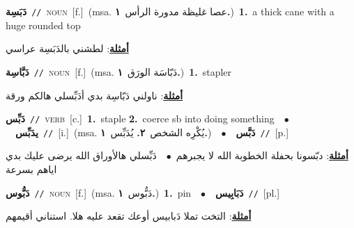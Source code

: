\documentclass[10pt,a4paper,twoside]{article} %
\begin{document}
\begin{multicols}{2}
{{{{\setlength\topsep{0pt}\textbf{\foreignlanguage{arabic}{دَبَسِة}}\ {\color{gray}\texttt{//}\color{black}}\ \textsc{noun}\ [f.]\ \color{gray}(msa. \foreignlanguage{arabic}{عصا غليظة مدورة الرأس}~\foreignlanguage{arabic}{\textbf{١.}})\color{black}\ \textbf{1.}~a thick cane with a huge rounded top\  \begin{flushright}\color{gray}\foreignlanguage{arabic}{\textbf{\underline{\foreignlanguage{arabic}{أمثلة}}}: لطشني بالدَبَسِة عراسي}\end{flushright}\color{black}} \vspace{2mm}

{\setlength\topsep{0pt}\textbf{\foreignlanguage{arabic}{دَبَّاسِة}}\ {\color{gray}\texttt{//}\color{black}}\ \textsc{noun}\ [f.]\ \color{gray}(msa. \foreignlanguage{arabic}{دَبّاسَة الورَق}~\foreignlanguage{arabic}{\textbf{١.}})\color{black}\ \textbf{1.}~stapler\  \begin{flushright}\color{gray}\foreignlanguage{arabic}{\textbf{\underline{\foreignlanguage{arabic}{أمثلة}}}: ناولني دَبّاسِة بدي أدَبِّسلي هالكم ورقة}\end{flushright}\color{black}} \vspace{2mm}

{\setlength\topsep{0pt}\textbf{\foreignlanguage{arabic}{دَبِّس}}\ {\color{gray}\texttt{//}\color{black}}\ \textsc{verb}\ [c.]\ \textbf{1.}~staple  \textbf{2.}~coerce sb into doing something\ \ $\bullet$\ \ \setlength\topsep{0pt}\textbf{\foreignlanguage{arabic}{يدَبِّس}}\ {\color{gray}\texttt{//}\color{black}}\ [i.]\ \color{gray}(msa. \foreignlanguage{arabic}{يُكْرِه الشخص}~\foreignlanguage{arabic}{\textbf{٢.}}  \foreignlanguage{arabic}{يُدَبِّس}~\foreignlanguage{arabic}{\textbf{١.}})\color{black}\ \ $\bullet$\ \ \setlength\topsep{0pt}\textbf{\foreignlanguage{arabic}{دَبَّس}}\ {\color{gray}\texttt{//}\color{black}}\ [p.]\  \begin{flushright}\color{gray}\foreignlanguage{arabic}{\textbf{\underline{\foreignlanguage{arabic}{أمثلة}}}: دبّسونا بحفلة الخطوبة الله لا يجبرهم\ $\bullet$\ \  دَبِّسلي هالأوراق الله يرضى عليك بدي اياهم بسرعة}\end{flushright}\color{black}} \vspace{2mm}

{\setlength\topsep{0pt}\textbf{\foreignlanguage{arabic}{دَبُّوس}}\ {\color{gray}\texttt{//}\color{black}}\ \textsc{noun}\ [f.]\ \color{gray}(msa. \foreignlanguage{arabic}{دَبُّوس}~\foreignlanguage{arabic}{\textbf{١.}})\color{black}\ \textbf{1.}~pin\ \ $\bullet$\ \ \setlength\topsep{0pt}\textbf{\foreignlanguage{arabic}{دَبَابِيس}}\ {\color{gray}\texttt{//}\color{black}}\ [pl.]\  \begin{flushright}\color{gray}\foreignlanguage{arabic}{\textbf{\underline{\foreignlanguage{arabic}{أمثلة}}}: التخت تملا دَبابيس أوعك تقعد عليه هلا. استناني أقيمهم}\end{flushright}\color{black}} \vspace{2mm}

}}}
\end{multicols}
\end{document}
